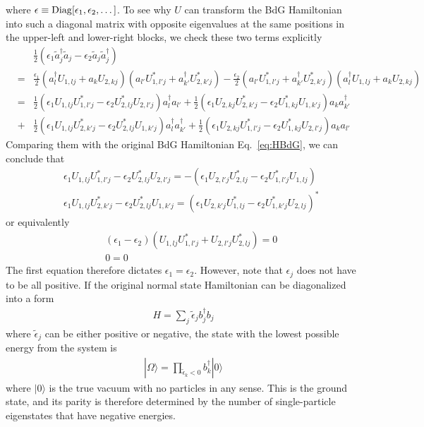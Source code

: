where $\epsilon \equiv {\rm Diag}[\epsilon_1, \epsilon_2,\dots]$. To see why $U$ can transform the BdG Hamiltonian into such a diagonal matrix with opposite eigenvalues at the same positions in the upper-left and lower-right blocks, we check these two terms explicitly
\begin{eqnarray}
	&&\frac{1}{2}(\epsilon_{1} \tilde{a}_j^\dag \tilde{a}_j - \epsilon_{2} \tilde{a}_j \tilde{a}_j^\dag)\\\nonumber
	&=& \frac{\epsilon_1}{2} (a_l^\dag U_{1,lj} + a_k U_{2,kj}) (a_{l'} U^*_{1,{l'}j} + a^\dag_{k'} U^*_{2,k'j}) - \frac{ \epsilon_2 }{2} (a_{l'} U^*_{1,{l'}j} + a^\dag_{k'} U^*_{2,k'j})(a_l^\dag U_{1,lj} + a_k U_{2,kj}) \\\nonumber
	&=& \frac{1}{2}(\epsilon_1 U_{1,lj} U_{1,l'j}^* - \epsilon_2 U^*_{2,lj} U_{2,l'j}) a^\dag_{l} a_{l'} + \frac{1}{2}(\epsilon_1 U_{2,kj} U^*_{2,k'j} -  \epsilon_2 U^*_{1,kj} U_{1, k'j}) a_k a_{k'}^\dag \\\nonumber
	&+& \frac{1}{2} (\epsilon_1 U_{1,lj} U_{2,k'j}^* - \epsilon_2 U_{2,lj}^* U_{1,k'j}) a_{l}^\dag a_{k'}^\dag + \frac{1}{2} (\epsilon_1 U_{2,kj} U^*_{1,l'j} -\epsilon_2 U_{1,kj}^* U_{2,l'j} ) a_{k} a_{l'}
\end{eqnarray}
Comparing them with the original BdG Hamiltonian Eq.~\ref{eq:HBdG}, we can conclude that
\begin{eqnarray}
&&	\epsilon_1 U_{1,lj} U_{1,l'j}^* - \epsilon_2 U^*_{2,lj} U_{2,l'j} = - (\epsilon_1 U_{2,l'j} U^*_{2,lj} -  \epsilon_2 U^*_{1,l'j} U_{1, lj}) \\\nonumber
&& \epsilon_1 U_{1,lj} U_{2,k'j}^* - \epsilon_2 U_{2,lj}^* U_{1,k'j} = (\epsilon_1 U_{2,k'j} U^*_{1,lj} -\epsilon_2 U_{1,k'j}^* U_{2,lj} )^*
\end{eqnarray}
or equivalently
\begin{eqnarray}
	&&(\epsilon_1 - \epsilon_2) (U_{1,lj} U_{1,l'j}^* + U_{2,l'j} U^*_{2,lj} )= 0 \\\nonumber
	&& 0 = 0
\end{eqnarray}
The first equation therefore dictates $\epsilon_1 = \epsilon_2$. However, note that $\epsilon_j$ does not have to be all positive. If the original normal state Hamiltonian can be diagonalized into a form
\begin{eqnarray}
	H = \sum_{j} \tilde{\epsilon}_{j} b^\dag_j b_j
\end{eqnarray}
where $\tilde{\epsilon}_{j}$ can be either positive or negative, the state with the lowest possible energy from the system is
\begin{eqnarray}
	|\Omega \rangle =  \prod_{\tilde{\epsilon}_k < 0} b_k^\dag | 0\rangle
\end{eqnarray}
where $|0\rangle$ is the true vacuum with no particles in any sense. This is the ground state, and its parity is therefore determined by the number of single-particle eigenstates that have negative energies.

